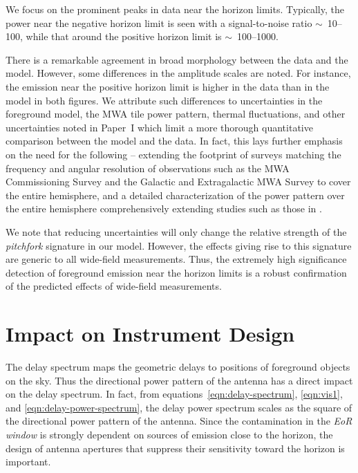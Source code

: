 \documentclass[preprint2,apjl,numberedappendix,twocolappendix,appendixfloats]{emulateapj}
\begin{document}
We focus on the prominent peaks in data near the horizon limits. Typically, the power near the negative horizon limit is seen with a signal-to-noise ratio $\sim$~10--100, while that around the positive horizon limit is $\sim$~100--1000. 

There is a remarkable agreement in broad morphology between the data and the model. However, some differences in the amplitude scales are noted. For instance, the emission near the positive horizon limit is higher in the data than in the model in both figures. We attribute such differences to uncertainties in the foreground model, the MWA tile power pattern, thermal fluctuations, and other uncertainties noted in Paper~I which limit a more thorough quantitative comparison between the model and the data. In fact, this lays further emphasis on the need for the following -- extending the footprint of surveys matching the frequency and angular resolution of observations such as the MWA Commissioning Survey \citep[MWACS;][]{hur14} and the Galactic and Extragalactic MWA Survey \citep[GLEAM;][]{way15} to cover the entire hemisphere, and a detailed characterization of the power pattern over the entire hemisphere comprehensively extending studies such as those in \citet{neb15}.

We note that reducing uncertainties will only change the relative strength of the {\it pitchfork} signature in our model. However, the effects giving rise to this signature are generic to all wide-field measurements. Thus, the extremely high significance detection of foreground emission near the horizon limits is a robust confirmation of the predicted effects of wide-field measurements.

\section{Impact on Instrument Design}\label{sec:impact}

The delay spectrum maps the geometric delays to positions of foreground objects on the sky. Thus the directional power pattern of the antenna has a direct impact on the delay spectrum. In fact, from equations~\ref{eqn:delay-spectrum}, \ref{eqn:vis1}, and \ref{eqn:delay-power-spectrum}, the delay power spectrum scales as the square of the directional power pattern of the antenna. Since the contamination in the {\it EoR window} is strongly dependent on sources of emission close to the horizon, the design of antenna apertures that suppress their sensitivity toward the horizon is important. 
\end{document}
